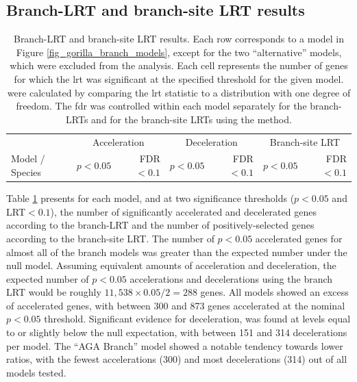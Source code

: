 \subsection{Branch-LRT and branch-site LRT results}

\begin{table}
\centering \scriptsize
\begin{tabular}{lrrrrrr}
\toprule
 & \multicolumn{2}{c}{Acceleration} & \multicolumn{2}{c}{Deceleration} & \multicolumn{2}{c}{Branch-site LRT} \\
Model / Species & $p<0.05$ & FDR$<0.1$ & $p<0.05$ & FDR$<0.1$ & $p<0.05$ & FDR$<0.1$ \\
  \midrule


\bottomrule
\end{tabular}
\caption{Branch-LRT and branch-site LRT results. Each row corresponds
  to a model in Figure \ref{fig_gorilla_branch_models}, except for the
  two ``alternative'' models, which were excluded from the
  analysis. Each cell represents the number of genes for which the
  \ac{lrt} was significant at the specified threshold for the given
  model. \pvs were calculated by comparing the \ac{lrt} statistic to a
  \chisq distribution with one degree of freedom. The \acf{fdr} was
  controlled within each model separately for the branch-LRTs and for
  the branch-site LRTs using the \citet{Benjamini1995} method.}
\label{table_gorilla_lrt_results}
\end{table}

Table \ref{table_gorilla_lrt_results} presents for each model, and at
two significance thresholds ($p<0.05$ and LRT$<0.1$), the number of
significantly accelerated and decelerated genes according to the
branch-LRT and the number of positively-selected genes according to
the branch-site LRT. The number of $p<0.05$ accelerated genes for
almost all of the branch models was greater than the expected number
under the null model. Assuming equivalent amounts of acceleration and
deceleration, the expected number of $p<0.05$ accelerations and
decelerations using the branch LRT would be roughly
$11,538\times0.05/2=288$ genes. All models showed an excess of
accelerated genes, with between 300 and 873 genes accelerated at the
nominal $p<0.05$ threshold. Significant evidence for deceleration, was
found at levels equal to or slightly below the null expectation, with
between 151 and 314 decelerations per model. The ``AGA Branch'' model
showed a notable tendency towards lower \dnds ratios, with the fewest
accelerations (300) and most decelerations (314) out of all models
tested.

